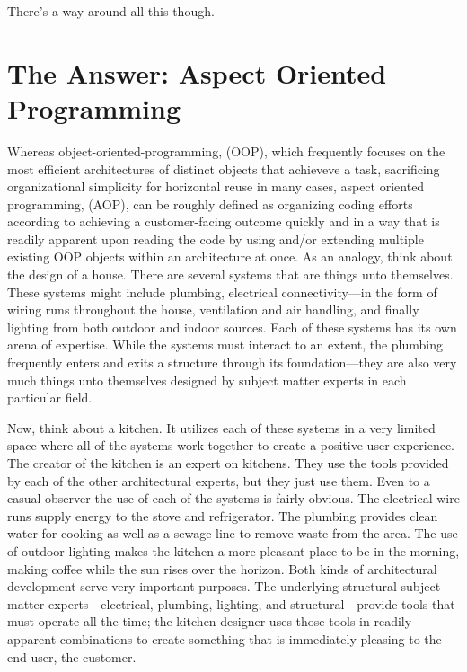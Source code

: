 \documentclass[twocolumn,letterpaper]{IEEEAerospaceCLS}  %
\begin{document}
There's a way around all this though.

\section{The Answer: Aspect Oriented Programming}
Whereas object-oriented-programming, (OOP), which frequently focuses on the most efficient architectures of distinct objects that achieveve a task, sacrificing organizational simplicity for horizontal reuse in many cases, aspect oriented programming, (AOP), can be roughly defined as organizing coding efforts according to achieving a customer-facing outcome quickly and in a way that is readily apparent upon reading the code by using and/or extending multiple existing OOP objects within an architecture at once. As an analogy, think about the design of a house. There are several systems that are things unto themselves. These systems might include plumbing, electrical connectivity—in the form of wiring runs throughout the house, ventilation and air handling, and finally lighting from both outdoor and indoor sources. Each of these systems has its own arena of expertise. While the systems must interact to an extent, the plumbing frequently enters and exits a structure through its foundation—they are also very much things unto themselves designed by subject matter experts in each particular field.

Now, think about a kitchen. It utilizes each of these systems in a very limited space where all of the systems work together to create a positive user experience. The creator of the kitchen is an expert on kitchens. They use the tools provided by each of the other architectural experts, but they just use them. Even to a casual observer the use of each of the systems is fairly obvious. The electrical wire runs supply energy to the stove and refrigerator. The plumbing provides clean water for cooking as well as a sewage line to remove waste from the area. The use of outdoor lighting makes the kitchen a more pleasant place to be in the morning, making coffee while the sun rises over the horizon. 
Both kinds of architectural development serve very important purposes. The underlying structural subject matter experts—electrical, plumbing, lighting, and structural—provide tools that must operate all the time; the kitchen designer uses those tools in readily apparent combinations to create something that is immediately pleasing to the end user, the customer.
\end{document}

